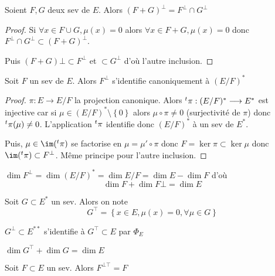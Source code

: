 \begin{prop}
    Soient $F, G$ deux sev de  $E$. Alors  $(F+G)^\bot =F^\bot \cap G^\bot$
\end{prop}

\begin{proof}
    Si $\forall  x \in  F\cup G, \mu(x)=0$ alors $\forall  x \in  F+G, \mu(x)=0$ donc $F^\bot \cap G^\bot \subset (F+G)^\bot$.

    Puis  $(F+G)\bot \subset F^\bot$ et  $\subset G^\bot$ d'où l'autre inclusion.
\end{proof}

\begin{prop}
    Soit $F$ un sev de  $E$. Alors  $F^\bot$ s'identifie canoniquement à  $(E / F)^*$
\end{prop}

\begin{proof}
    $\pi:E \longrightarrow E / F$ la projection canonique. Alors ${}^t \pi:(E / F)^* \longrightarrow  E^*$ est injective car si $\mu \in  (E / F)^* \setminus \left\{ 0 \right\} $ alors $\mu \circ \pi\neq 0$ (surjectivité de $\pi$) donc ${}^t \pi (\mu)\neq  0$. L'application ${}^t \pi$ identifie donc  $(E / F)^*$ à un sev de  $E^*$.

    Puis, $\mu \in  \im(\transpose \pi)$ se factorise en $\mu=\mu'\circ \pi$ donc $F=\ker \pi \subset \ker \mu$ donc $\im(\transpose \pi)\subset F^\bot$. Même principe pour l'autre inclusion.
\end{proof}

\begin{cor}
    $\dim F^\bot=\dim (E / F)^* = \dim E / F = \dim E-  \dim F$ d'où  \[
    \dim F+\dim F\bot = \dim E
    \] 
\end{cor}

\begin{dfn}
Soit $G\subset E^*$ un sev. Alors  on note\[
    G^\top = \left\{ x \in  E, \mu(x)=0, \forall  \mu \in  G \right\} 
\] 
\end{dfn}

\begin{prop}
$G^\bot\subset E ^{**}$ s'identifie à $G^\top \subset E$ par  $\Phi_E$
\end{prop}

\begin{cor}
$\dim G^\top+\dim G=\dim E$
\end{cor}

\begin{prop}
Soit $F\subset E$ un sev. Alors  $F^{\bot\top}=F$
\end{prop}

